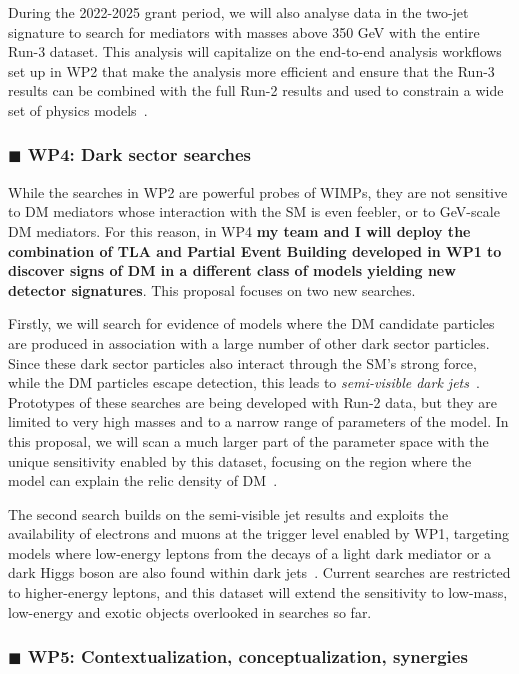 \documentclass[11pt,a4paper]{article}
\begin{document}
During the 2022-2025 grant period, we will also analyse data in the two-jet signature to search for mediators with masses above 350 GeV with the entire Run-3 dataset. 
This analysis will capitalize on the end-to-end analysis workflows set up in WP2 that make the analysis more efficient and ensure that the Run-3 results can be combined with the full Run-2 results and used to constrain a wide set of physics models~\cite{Kim:2019rhy}.   

\subsubsection*{\color{orange} $\blacksquare$ \color{black} WP4: Dark sector searches}

While the searches in WP2 are powerful probes of WIMPs, they are not sensitive to DM mediators whose interaction with the SM is even feebler, or to GeV-scale DM mediators. 
For this reason, in WP4 \textbf
{my team and I will deploy the combination of TLA and Partial Event Building developed in WP1 to discover signs of DM in a different class of models yielding new detector signatures}. 
This proposal focuses on two new searches.  

Firstly, we will search for evidence of models where the DM candidate particles are produced in association with a large number of other dark sector particles. 
Since these dark sector particles also interact through the SM's strong force, while the DM particles escape detection, this leads to \textit{semi-visible dark jets}~\cite{Cohen:2017pzm}.
Prototypes of these searches are being developed with Run-2 data, but they are limited to very high masses and to a narrow range of parameters of the model. 
In this proposal, we will scan a much larger part of the parameter space with the unique sensitivity enabled by this dataset, focusing on the region where the model can explain the relic density of DM~\cite{Bernreuther:2019pfb}. 

The second search builds on the semi-visible jet results and exploits the availability of electrons and muons at the trigger level enabled by WP1, targeting models where low-energy leptons from the decays of a light dark mediator or a dark Higgs boson are also found within dark jets~\cite{Curtin:2014cca,Falkowski:2010gv}. %
Current searches are restricted to higher-energy leptons, and this dataset will extend the sensitivity to low-mass, low-energy and exotic objects overlooked in searches so far. 

\subsubsection*{\color{violet} $\blacksquare$ \color{black} WP5: Contextualization, conceptualization, synergies}
\end{document}
